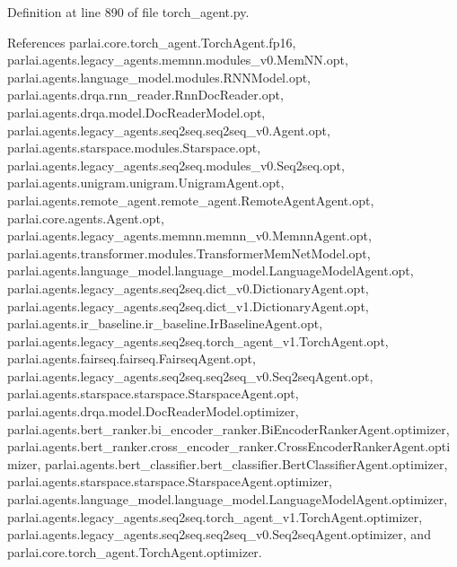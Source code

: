 Definition at line 890 of file torch\+\_\+agent.\+py.



References parlai.\+core.\+torch\+\_\+agent.\+Torch\+Agent.\+fp16, parlai.\+agents.\+legacy\+\_\+agents.\+memnn.\+modules\+\_\+v0.\+Mem\+N\+N.\+opt, parlai.\+agents.\+language\+\_\+model.\+modules.\+R\+N\+N\+Model.\+opt, parlai.\+agents.\+drqa.\+rnn\+\_\+reader.\+Rnn\+Doc\+Reader.\+opt, parlai.\+agents.\+drqa.\+model.\+Doc\+Reader\+Model.\+opt, parlai.\+agents.\+legacy\+\_\+agents.\+seq2seq.\+seq2seq\+\_\+v0.\+Agent.\+opt, parlai.\+agents.\+starspace.\+modules.\+Starspace.\+opt, parlai.\+agents.\+legacy\+\_\+agents.\+seq2seq.\+modules\+\_\+v0.\+Seq2seq.\+opt, parlai.\+agents.\+unigram.\+unigram.\+Unigram\+Agent.\+opt, parlai.\+agents.\+remote\+\_\+agent.\+remote\+\_\+agent.\+Remote\+Agent\+Agent.\+opt, parlai.\+core.\+agents.\+Agent.\+opt, parlai.\+agents.\+legacy\+\_\+agents.\+memnn.\+memnn\+\_\+v0.\+Memnn\+Agent.\+opt, parlai.\+agents.\+transformer.\+modules.\+Transformer\+Mem\+Net\+Model.\+opt, parlai.\+agents.\+language\+\_\+model.\+language\+\_\+model.\+Language\+Model\+Agent.\+opt, parlai.\+agents.\+legacy\+\_\+agents.\+seq2seq.\+dict\+\_\+v0.\+Dictionary\+Agent.\+opt, parlai.\+agents.\+legacy\+\_\+agents.\+seq2seq.\+dict\+\_\+v1.\+Dictionary\+Agent.\+opt, parlai.\+agents.\+ir\+\_\+baseline.\+ir\+\_\+baseline.\+Ir\+Baseline\+Agent.\+opt, parlai.\+agents.\+legacy\+\_\+agents.\+seq2seq.\+torch\+\_\+agent\+\_\+v1.\+Torch\+Agent.\+opt, parlai.\+agents.\+fairseq.\+fairseq.\+Fairseq\+Agent.\+opt, parlai.\+agents.\+legacy\+\_\+agents.\+seq2seq.\+seq2seq\+\_\+v0.\+Seq2seq\+Agent.\+opt, parlai.\+agents.\+starspace.\+starspace.\+Starspace\+Agent.\+opt, parlai.\+agents.\+drqa.\+model.\+Doc\+Reader\+Model.\+optimizer, parlai.\+agents.\+bert\+\_\+ranker.\+bi\+\_\+encoder\+\_\+ranker.\+Bi\+Encoder\+Ranker\+Agent.\+optimizer, parlai.\+agents.\+bert\+\_\+ranker.\+cross\+\_\+encoder\+\_\+ranker.\+Cross\+Encoder\+Ranker\+Agent.\+optimizer, parlai.\+agents.\+bert\+\_\+classifier.\+bert\+\_\+classifier.\+Bert\+Classifier\+Agent.\+optimizer, parlai.\+agents.\+starspace.\+starspace.\+Starspace\+Agent.\+optimizer, parlai.\+agents.\+language\+\_\+model.\+language\+\_\+model.\+Language\+Model\+Agent.\+optimizer, parlai.\+agents.\+legacy\+\_\+agents.\+seq2seq.\+torch\+\_\+agent\+\_\+v1.\+Torch\+Agent.\+optimizer, parlai.\+agents.\+legacy\+\_\+agents.\+seq2seq.\+seq2seq\+\_\+v0.\+Seq2seq\+Agent.\+optimizer, and parlai.\+core.\+torch\+\_\+agent.\+Torch\+Agent.\+optimizer.

\mbox{\label{classparlai_1_1core_1_1torch__agent_1_1TorchAgent_a9a21fa33fa5b2b928024fbc67826f233}} 
